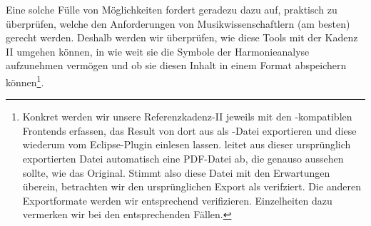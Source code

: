 Eine solche Fülle von Möglichkeiten fordert geradezu dazu auf, praktisch zu
überprüfen, welche den Anforderungen von Musikwissenschaftlern (am besten)
gerecht werden. Deshalb werden wir überprüfen, wie diese Tools mit der Kadenz II
umgehen können, in wie weit sie die Symbole der Harmonieanalyse aufzunehmen
vermögen und ob sie diesen Inhalt in einem Format abspeichern
können\footnote{Konkret werden wir unsere Referenzkadenz-II jeweils mit den
-kompatiblen Frontends erfassen, das Result von dort aus als
-Datei exportieren und diese wiederum vom Eclipse-Plugin
 einlesen lassen.  leitet aus dieser ursprünglich
exportierten Datei automatisch eine PDF-Datei ab, die genauso aussehen sollte,
wie das Original. Stimmt also diese Datei mit den Erwartungen überein,
betrachten wir den ursprünglichen Export als verifziert.\label{ExportVerifikation}
Die anderen Exportformate werden wir entsprechend verifizieren. Einzelheiten dazu
vermerken wir bei den entsprechenden Fällen.}.

%
